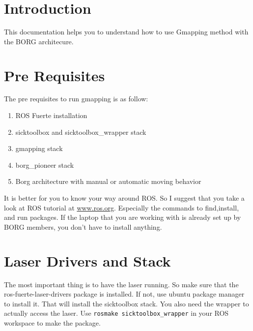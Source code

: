 \documentclass[a4paper, 12pt, oneside]{report}
\title{\titleVariable}
\author{\authorVariable}
\date{\centering Last modification: \today}
\begin{document}
\maketitle

\begin{abstract}
\end{abstract}

\tableofcontents

\section{Introduction}

This documentation helps you to understand how to use Gmapping method with the BORG architecure.

\section{Pre Requisites}
The pre requisites to run gmapping is as follow:

\begin{enumerate}
 \item ROS Fuerte installation
 \item sicktoolbox and sicktoolbox\_wrapper stack
 \item gmapping stack
 \item borg\_pioneer stack 
 \item Borg architecture with manual or automatic moving behavior
\end{enumerate}

It is better for you to know your way around ROS. So I suggest that you take a look at ROS tutorial at 
\url{www.ros.org}. Especially the commands to find,install, and run packages. If the laptop that you are working with is
already set up by BORG members, you don't have to install anything.

\section{Laser Drivers and Stack}
The most important thing is to have the laser running. So make sure that the ros-fuerte-laser-drivers package is installed. If not,
use ubuntu package manager to install it. That will install the sicktoolbox stack. You also need the wrapper to actually access the laser.
Use \verb|rosmake sicktoolbox_wrapper| in your ROS workspace to make the package.\\
\end{document}

